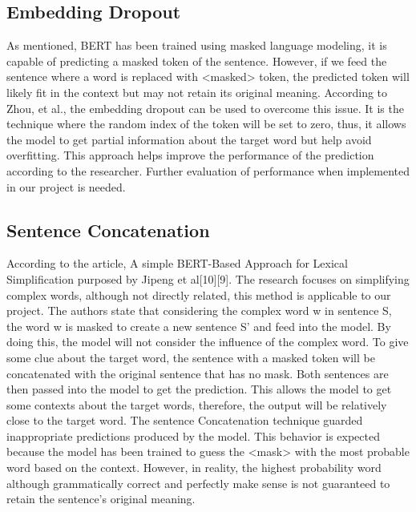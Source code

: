 \documentclass[12pt,oneside,openright,a4paper]{cpe-english-project}
\begin{document}
\subsection{Embedding Dropout}
As mentioned, BERT has been trained using masked language modeling, it is capable of predicting a masked token of the sentence. However, if we feed the sentence where a word is replaced with <masked> token, the predicted token will likely fit in the context but may not retain its original meaning. According to Zhou, et al.\cite{k}\cite{o}, the embedding dropout can be used to overcome this issue. It is the technique where the random index of the token will be set to zero, thus, it allows the model to get partial information about the target word but help avoid overfitting. This approach helps improve the performance of the prediction according to the researcher. Further evaluation of performance when implemented in our project is needed.

\subsection{Sentence Concatenation}
According to the article, A simple BERT-Based Approach for Lexical Simplification purposed by Jipeng et al[10][9]. The research focuses on simplifying complex words, although not directly related, this method is applicable to our project. The authors state that considering the complex word w in sentence S, the word w is masked to create a new sentence S’ and feed into the model. By doing this, the model will not consider the influence of the complex word. To give some clue about the target word, the sentence with a masked token will be concatenated with the original sentence that has no mask. Both sentences are then passed into the model to get the prediction. This allows the model to get some contexts about the target words, therefore, the output will be relatively close to the target word. The sentence Concatenation technique guarded inappropriate predictions produced by the model. This behavior is expected because the model has been trained to guess the <mask> with the most probable word based on the context. However, in reality, the highest probability word although grammatically correct and perfectly make sense is not guaranteed to retain the sentence’s original meaning. 
\end{document}
